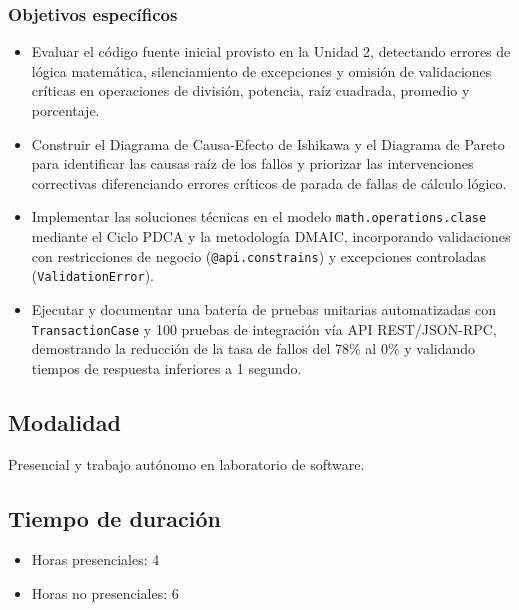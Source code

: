 \documentclass{article}
\begin{document}
\subsubsection{Objetivos específicos}
\begin{itemize}
    \item Evaluar el código fuente inicial provisto en la Unidad 2, detectando errores de lógica matemática, silenciamiento de excepciones y omisión de validaciones críticas en operaciones de división, potencia, raíz cuadrada, promedio y porcentaje.
    \item Construir el Diagrama de Causa-Efecto de Ishikawa y el Diagrama de Pareto para identificar las causas raíz de los fallos y priorizar las intervenciones correctivas diferenciando errores críticos de parada de fallas de cálculo lógico.
    \item Implementar las soluciones técnicas en el modelo \texttt{math.operations.clase} mediante el Ciclo PDCA y la metodología DMAIC, incorporando validaciones con restricciones de negocio (\texttt{@api.constrains}) y excepciones controladas (\texttt{ValidationError}).
    \item Ejecutar y documentar una batería de pruebas unitarias automatizadas con \texttt{TransactionCase} y 100 pruebas de integración vía API REST/JSON-RPC, demostrando la reducción de la tasa de fallos del 78\% al 0\% y validando tiempos de respuesta inferiores a 1 segundo.
\end{itemize}

\subsection{Modalidad}
Presencial y trabajo autónomo en laboratorio de software.

\subsection{Tiempo de duración}
\begin{itemize}
    \item Horas presenciales: 4
    \item Horas no presenciales: 6
\end{itemize}
\end{document}
